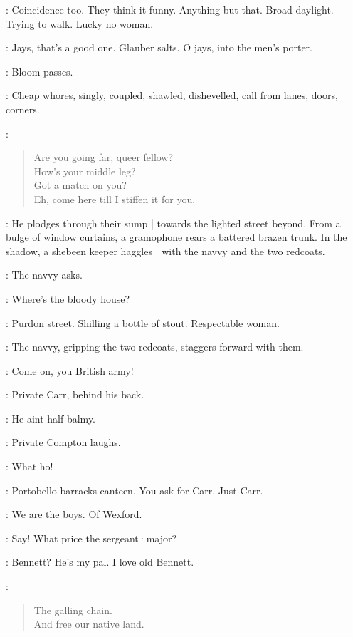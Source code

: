\Bloom:
Coincidence too.
They think it funny.
Anything but that.
Broad daylight.
Trying to walk.
Lucky no woman.

\Loiterers:
Jays,
that's a good one.
Glauber salts.
O jays,
into the men's porter.

:
Bloom passes.

:
Cheap whores,
singly,
coupled,
shawled,
dishevelled,
call from lanes,
doors,
corners.

\Whores:
\begin{verse}
%
    Are you going far, queer fellow?\\
    How's your middle leg?\\
    Got a match on you?\\
    Eh, come here till I stiffen it for you.
\end{verse}

:
He plodges through their sump |
towards the lighted street beyond.
From a bulge of window curtains,
a gramophone rears a battered brazen trunk.
In the shadow,
a shebeen keeper haggles |
with the navvy and the two redcoats.

:
The navvy asks.

\Navvy:
Where's the bloody house?

\ShebeenKeeper[1]:
Purdon street.
Shilling a bottle of stout.
Respectable woman.

:
The navvy,
gripping the two redcoats,
staggers forward with them.

\Navvy:
Come on,
you British army!

:
Private Carr,
behind his back.

\Carr:
He aint half balmy.

:
Private Compton laughs.

\Compton:
What ho!

\Carr:
Portobello barracks canteen.
You ask for Carr.
Just Carr.

\Navvy:
We are the boys.
Of Wexford.

\Compton:
Say!
What price the sergeant·major?

\Carr:
Bennett?
He's my pal.
I love old Bennett.

\Navvy:
\begin{verse}
%
    The galling chain.\\
    And free our native land.
\end{verse}


